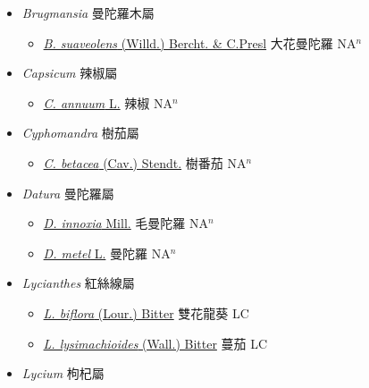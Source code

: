
  \begin{itemize}
 \item[] \textit{Brugmansia} 曼陀羅木屬
                    
  \begin{itemize}
        \item[] \href{http://www.theplantlist.org/tpl1.1/search?q=Brugmansia+suaveolens}{\textit{B. suaveolens} (Willd.) Bercht. \& C.Presl}   大花曼陀羅 NA$^n$
  \end{itemize}
 \item[] \textit{Capsicum} 辣椒屬
                    
  \begin{itemize}
        \item[] \href{http://www.theplantlist.org/tpl1.1/search?q=Capsicum+annuum}{\textit{C. annuum} L.}   辣椒 NA$^n$
  \end{itemize}
 \item[] \textit{Cyphomandra} 樹茄屬
                    
  \begin{itemize}
        \item[] \href{http://www.theplantlist.org/tpl1.1/search?q=Cyphomandra+betacea}{\textit{C. betacea} (Cav.) Stendt.}   樹番茄 NA$^n$
  \end{itemize}
 \item[] \textit{Datura} 曼陀羅屬
                    
  \begin{itemize}
        \item[] \href{http://www.theplantlist.org/tpl1.1/search?q=Datura+innoxia}{\textit{D. innoxia} Mill.}     毛曼陀羅 NA$^n$
        \item[] \href{http://www.theplantlist.org/tpl1.1/search?q=Datura+metel}{\textit{D. metel} L.}   曼陀羅 NA$^n$
  \end{itemize}
 \item[] \textit{Lycianthes} 紅絲線屬
                    
  \begin{itemize}
        \item[] \href{http://www.theplantlist.org/tpl1.1/search?q=Lycianthes+biflora}{\textit{L. biflora} (Lour.) Bitter}   雙花龍葵 LC
        \item[] \href{http://www.theplantlist.org/tpl1.1/search?q=Lycianthes+lysimachioides}{\textit{L. lysimachioides} (Wall.) Bitter}   蔓茄 LC
  \end{itemize}
 \item[] \textit{Lycium} 枸杞屬
                    

\end{itemize}
